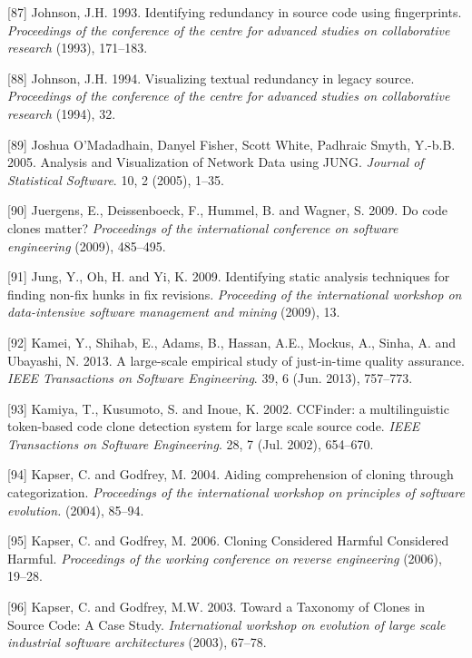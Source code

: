 \documentclass[12pt]{report}
\begin{document}
\hypertarget{ref-Johnson1993}{}
{[}87{]} Johnson, J.H. 1993. Identifying redundancy in source code using
fingerprints. \emph{Proceedings of the conference of the centre for
advanced studies on collaborative research} (1993), 171--183.

\hypertarget{ref-Johnson1994}{}
{[}88{]} Johnson, J.H. 1994. Visualizing textual redundancy in legacy
source. \emph{Proceedings of the conference of the centre for advanced
studies on collaborative research} (1994), 32.

\hypertarget{ref-JoshuaOMadadhain}{}
{[}89{]} Joshua O'Madadhain, Danyel Fisher, Scott White, Padhraic Smyth,
Y.-b.B. 2005. Analysis and Visualization of Network Data using JUNG.
\emph{Journal of Statistical Software}. 10, 2 (2005), 1--35.

\hypertarget{ref-Juergens2009}{}
{[}90{]} Juergens, E., Deissenboeck, F., Hummel, B. and Wagner, S. 2009.
Do code clones matter? \emph{Proceedings of the international conference
on software engineering} (2009), 485--495.

\hypertarget{ref-Jung2009}{}
{[}91{]} Jung, Y., Oh, H. and Yi, K. 2009. Identifying static analysis
techniques for finding non-fix hunks in fix revisions. \emph{Proceeding
of the international workshop on data-intensive software management and
mining} (2009), 13.

\hypertarget{ref-Kamei2013}{}
{[}92{]} Kamei, Y., Shihab, E., Adams, B., Hassan, A.E., Mockus, A.,
Sinha, A. and Ubayashi, N. 2013. A large-scale empirical study of
just-in-time quality assurance. \emph{IEEE Transactions on Software
Engineering}. 39, 6 (Jun. 2013), 757--773.

\hypertarget{ref-Kamiya2002}{}
{[}93{]} Kamiya, T., Kusumoto, S. and Inoue, K. 2002. CCFinder: a
multilinguistic token-based code clone detection system for large scale
source code. \emph{IEEE Transactions on Software Engineering}. 28, 7
(Jul. 2002), 654--670.

\hypertarget{ref-Kapser}{}
{[}94{]} Kapser, C. and Godfrey, M. 2004. Aiding comprehension of
cloning through categorization. \emph{Proceedings of the international
workshop on principles of software evolution.} (2004), 85--94.

\hypertarget{ref-Kapser2006}{}
{[}95{]} Kapser, C. and Godfrey, M. 2006. Cloning Considered Harmful
Considered Harmful. \emph{Proceedings of the working conference on
reverse engineering} (2006), 19--28.

\hypertarget{ref-CoryKapser}{}
{[}96{]} Kapser, C. and Godfrey, M.W. 2003. Toward a Taxonomy of Clones
in Source Code: A Case Study. \emph{International workshop on evolution
of large scale industrial software architectures} (2003), 67--78.
\end{document}
